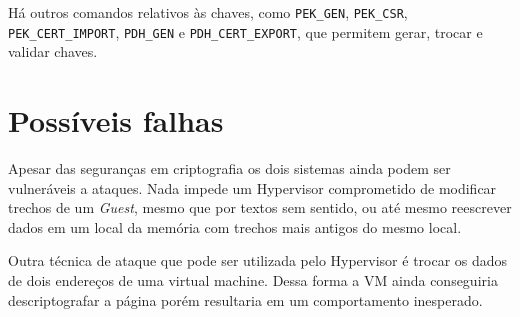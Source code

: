 \documentclass{report}
\begin{document}
Há outros comandos relativos às chaves, como \texttt{PEK\_GEN},
\texttt{PEK\_CSR}, \texttt{PEK\_CERT\_IMPORT}, \texttt{PDH\_GEN} e
\texttt{PDH\_CERT\_EXPORT}, que permitem gerar, trocar e validar chaves.

\section{Possíveis falhas}

Apesar das seguranças em criptografia os dois sistemas ainda podem ser
vulneráveis a ataques. Nada impede um Hypervisor comprometido de modificar
trechos de um \textit{Guest}, mesmo que por textos sem sentido, ou até mesmo
reescrever dados em um local da memória com trechos mais antigos do mesmo
local.

Outra técnica de ataque que pode ser utilizada pelo Hypervisor é trocar os
dados de dois endereços de uma virtual machine. Dessa forma a VM ainda
conseguiria descriptografar a página porém resultaria em um comportamento
inesperado.


\nocite{*}

\end{document}
